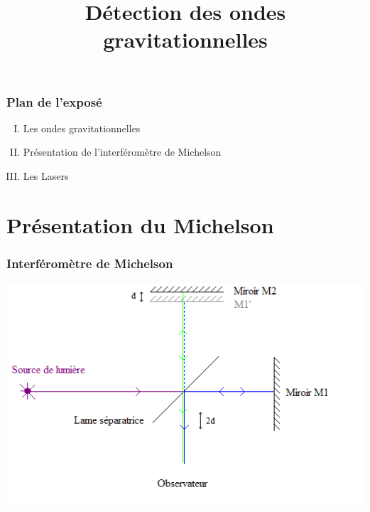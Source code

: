\documentclass{beamer}
\title{Détection des ondes gravitationnelles}
\begin{document}
\begin{frame}
	\titlepage
\end{frame}

\begin{frame}
	\frametitle{Plan de l'exposé}
	\begin{enumerate}[I.]
		\item Les ondes gravitationnelles
		\item Présentation de l'interféromètre de Michelson
		\item Les Lasers
	\end{enumerate}
\end{frame}


\section{Présentation du Michelson}

\begin{frame}
	\frametitle{Interféromètre de Michelson}
	\includegraphics[scale=0.5]{Docs/interferometre_michelson.png}
\end{frame}
\end{document}
